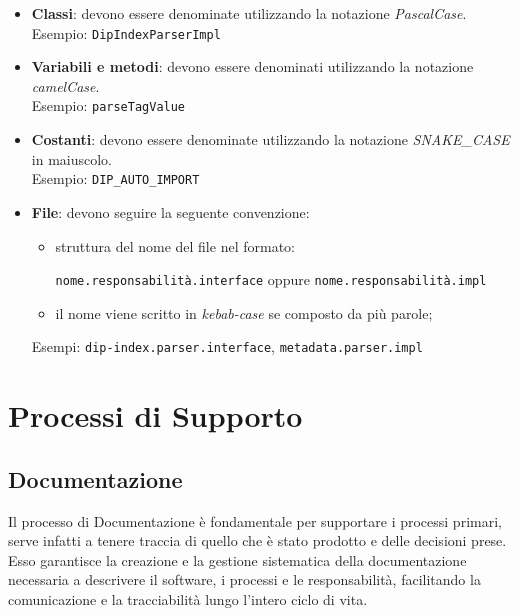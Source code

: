 \documentclass[a4paper,12pt]{article}
\begin{document}
                \begin{itemize}
                    \item \textbf{Classi}: devono essere denominate utilizzando la notazione \textit{PascalCase}.\\
                    Esempio: \texttt{DipIndexParserImpl}
                
                    \item \textbf{Variabili e metodi}: devono essere denominati utilizzando la notazione \textit{camelCase}.\\
                    Esempio: \texttt{parseTagValue}
                
                    \item \textbf{Costanti}: devono essere denominate utilizzando la notazione \textit{SNAKE\_CASE} in maiuscolo.\\
                    Esempio: \texttt{DIP\_AUTO\_IMPORT}
                
                    \item \textbf{File}: devono seguire la seguente convenzione:
                    \begin{itemize}
                        \item struttura del nome del file nel formato:
                        \begin{center}
                            \texttt{nome.responsabilità.interface} \quad oppure \quad \texttt{nome.responsabilità.impl}
                        \end{center}
                        \item il nome viene scritto in \textit{kebab-case} se composto da più parole;
                    \end{itemize}
                    Esempi: \texttt{dip-index.parser.interface}, \texttt{metadata.parser.impl}
                \end{itemize}
                
\newpage

\section{Processi di Supporto}
    \subsection{Documentazione}
        Il processo di Documentazione è fondamentale per supportare i processi primari, serve infatti a tenere traccia di quello che è stato prodotto e delle decisioni prese.
        Esso garantisce la creazione e la gestione sistematica della documentazione necessaria a descrivere il software, i processi e le responsabilità, facilitando la comunicazione e la tracciabilità lungo l'intero ciclo di vita.
\end{document}
